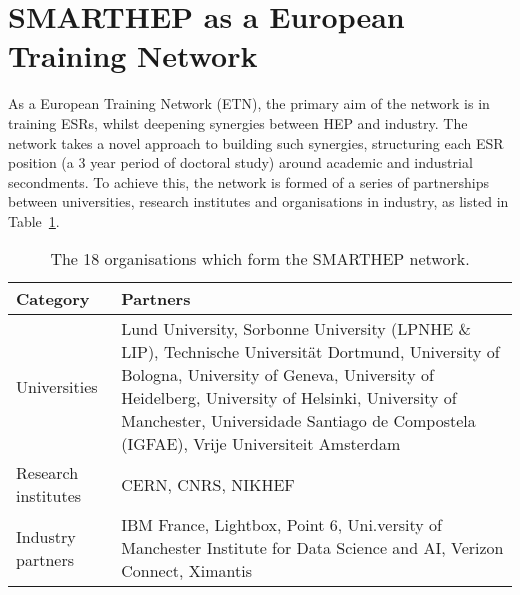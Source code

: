 \section{SMARTHEP as a European Training Network}
\label{network}
As a European Training Network (ETN), the primary aim of the network is in training ESRs, whilst deepening synergies between HEP and industry. The network takes a novel approach to building such synergies, structuring each ESR position (a 3 year period of doctoral study) around academic and industrial secondments. To achieve this, the network is formed of a series of partnerships between universities, research institutes and organisations in industry, as listed in Table~\ref{partners}.\par

\begin{table}[h!]
    \centering
    \small
    \begin{tabular}{p{2.5cm}p{9.5cm}}
    \hline
    Category & Partners \\\hline
    Universities & Lund University, Sorbonne University (LPNHE \& LIP), Technische Universit\"at Dortmund, University of Bologna, University of Geneva, University of Heidelberg, University of Helsinki, University of Manchester, Universidade Santiago de Compostela (IGFAE), Vrije Universiteit Amsterdam \\\hline
    Research institutes & CERN, CNRS, NIKHEF  \\\hline
    Industry partners & IBM France, Lightbox, Point 6, Uni.versity of Manchester Institute for Data Science and AI, Verizon Connect, Ximantis\\\hline
    \end{tabular}
    \caption{The 18 organisations which form the SMARTHEP network.}
    \label{partners}       
\end{table}

